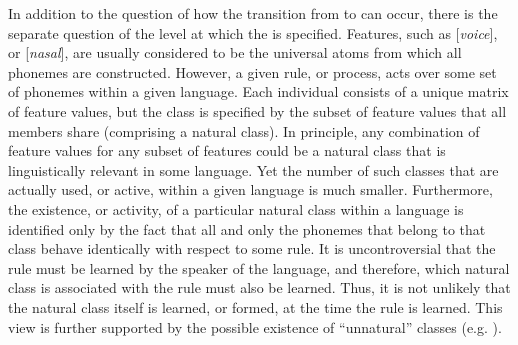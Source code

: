 In addition to the question of how the transition from to can occur, there is the separate question of the
level at which the  is specified. Features, such as {[}\emph{voice}{]},
or {[}\emph{nasal}{]}, are usually considered to be the universal
atoms from which all phonemes are constructed. However, a given rule,
or process, acts over some set of phonemes within a given language.
Each individual  consists of a unique matrix of feature values,
but the  class is specified by the subset of feature values
that all members share (comprising a natural class). In principle,
any combination of feature values for any subset of features could
be a natural class that is linguistically relevant in some language.
Yet the number of such classes that are actually used, or active,
within a given language is much smaller. Furthermore, the existence,
or activity, of a particular natural class within a language is identified
only by the fact that all and only the phonemes that belong to that
class behave identically with respect to some rule. It is uncontroversial
that the rule must be learned by the speaker of the language, and
therefore, which natural class is associated with the rule must also
be learned. Thus, it is not unlikely that the natural class itself
is learned, or formed, at the time the rule is learned. This view
is further supported by the possible existence of “unnatural”
classes (e.g. \citealt{Mielke2008}).

